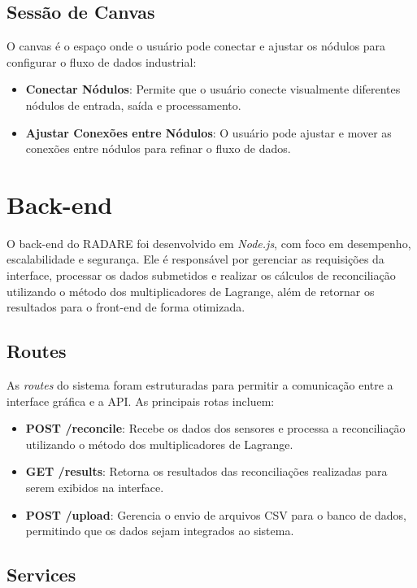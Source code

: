 \subsection{Sessão de Canvas}

O canvas é o espaço onde o usuário pode conectar e ajustar os nódulos para configurar o fluxo de dados industrial:

\begin{itemize}
    \item \textbf{Conectar Nódulos}: Permite que o usuário conecte visualmente diferentes nódulos de entrada, saída e processamento.
    \item \textbf{Ajustar Conexões entre Nódulos}: O usuário pode ajustar e mover as conexões entre nódulos para refinar o fluxo de dados.
\end{itemize}

\section{Back-end}

O back-end do RADARE foi desenvolvido em \textit{Node.js}, com foco em desempenho, escalabilidade e segurança. Ele é responsável por gerenciar as requisições da interface, processar os dados submetidos e realizar os cálculos de reconciliação utilizando o método dos multiplicadores de Lagrange, além de retornar os resultados para o front-end de forma otimizada.

\subsection{Routes}

As \textit{routes} do sistema foram estruturadas para permitir a comunicação entre a interface gráfica e a API. As principais rotas incluem:

\begin{itemize} \item \textbf{POST /reconcile}: Recebe os dados dos sensores e processa a reconciliação utilizando o método dos multiplicadores de Lagrange. \item \textbf{GET /results}: Retorna os resultados das reconciliações realizadas para serem exibidos na interface. \item \textbf{POST /upload}: Gerencia o envio de arquivos CSV para o banco de dados, permitindo que os dados sejam integrados ao sistema. \end{itemize}

\subsection{Services}

